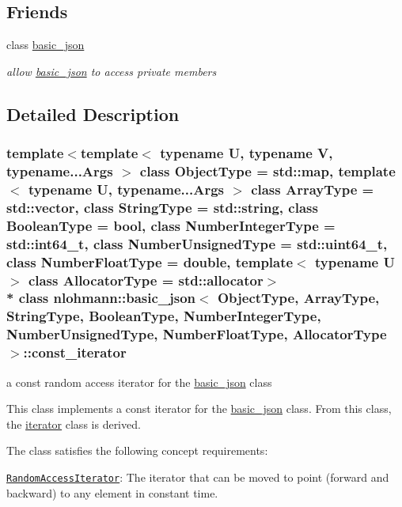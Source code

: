 \subsection*{Friends}
\begin{DoxyCompactItemize}
\item 
class \hyperlink{classnlohmann_1_1basic__json_1_1const__iterator_ada3100cdb8700566051828f1355fa745}{basic\+\_\+json}
\begin{DoxyCompactList}\small\item\em allow \hyperlink{classnlohmann_1_1basic__json}{basic\+\_\+json} to access private members \end{DoxyCompactList}\end{DoxyCompactItemize}


\subsection{Detailed Description}
\subsubsection*{template$<$template$<$ typename U, typename V, typename...\+Args $>$ class Object\+Type = std\+::map, template$<$ typename U, typename...\+Args $>$ class Array\+Type = std\+::vector, class String\+Type = std\+::string, class Boolean\+Type = bool, class Number\+Integer\+Type = std\+::int64\+\_\+t, class Number\+Unsigned\+Type = std\+::uint64\+\_\+t, class Number\+Float\+Type = double, template$<$ typename U $>$ class Allocator\+Type = std\+::allocator$>$\\*
class nlohmann\+::basic\+\_\+json$<$ Object\+Type, Array\+Type, String\+Type, Boolean\+Type, Number\+Integer\+Type, Number\+Unsigned\+Type, Number\+Float\+Type, Allocator\+Type $>$\+::const\+\_\+iterator}

a const random access iterator for the \hyperlink{classnlohmann_1_1basic__json}{basic\+\_\+json} class 

This class implements a const iterator for the \hyperlink{classnlohmann_1_1basic__json}{basic\+\_\+json} class. From this class, the \hyperlink{classnlohmann_1_1basic__json_1_1iterator}{iterator} class is derived.

The class satisfies the following concept requirements\+:
\begin{DoxyItemize}
\item \href{http://en.cppreference.com/w/cpp/concept/RandomAccessIterator}{\tt Random\+Access\+Iterator}\+: The iterator that can be moved to point (forward and backward) to any element in constant time.
\end{DoxyItemize}

